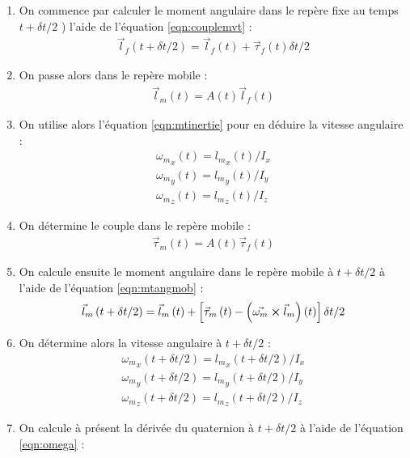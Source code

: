 \documentclass[12pt]{article}
\begin{document}
\begin{enumerate}
\item On commence par calculer le moment angulaire dans le repère fixe au temps $t+\delta t/2$ ) l'aide de l'équation \ref{eqn:couplemvt} :
\begin{eqnarray}
\vec{l}_f\left(t+\delta t/2\right)=\vec{l}_f\left(t\right)+\vec{\tau}_f\left(t\right) \delta t/2
\end{eqnarray}
\item On passe alors dans le repère mobile :
\begin{eqnarray}
\vec{l}_m\left(t\right)=A\left(t\right)\vec{l}_f\left(t\right)
\end{eqnarray}
\item On utilise alors l'équation \ref{eqn:mtinertie} pour en déduire la vitesse angulaire :
\begin{eqnarray}
{\omega_m}_x\left(t\right)={l_m}_x\left(t\right)/I_x \nonumber \\
{\omega_m}_y\left(t\right)={l_m}_y\left(t\right)/I_y \\
{\omega_m}_z\left(t\right)={l_m}_z\left(t\right)/I_z \nonumber
\end{eqnarray}
\item On détermine le couple dans le repère mobile :
\begin{eqnarray}
\vec{\tau}_m\left(t\right)=A\left(t\right)\vec{\tau}_f\left(t\right)
\end{eqnarray}
\item On calcule ensuite le moment angulaire dans le repère mobile à $t+\delta t/2$ à l'aide de l'équation \ref{eqn:mtangmob} :
\begin{eqnarray}
\vec{l}_m\left(t+\delta t/2\right)=\vec{l}_m\left(t\right)+\left[\vec{\tau}_m\left(t\right)-\left(\vec{\omega_m}\boldsymbol\times \vec{l}_m\right)\left(t\right)\right]\delta t/2
\end{eqnarray}
\item On détermine alors la vitesse angulaire à $t+\delta t/2$ :
\begin{eqnarray}
{\omega_m}_x\left(t+\delta t/2\right)={l_m}_x\left(t+\delta t/2\right)/I_x \nonumber \\
{\omega_m}_y\left(t+\delta t/2\right)={l_m}_y\left(t+\delta t/2\right)/I_y \\
{\omega_m}_z\left(t+\delta t/2\right)={l_m}_z\left(t+\delta t/2\right)/I_z
\end{eqnarray}
\item On calcule à présent la dérivée du quaternion à $t+\delta t/2$ à l'aide de l'équation \ref{eqn:omega} :

\end{enumerate}
\end{document}
